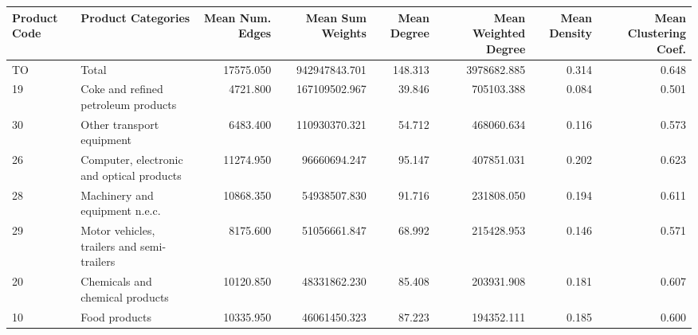 \begin{tabular}{llrrrrrr}
\toprule
Product Code &                                                                                           Product Categories & Mean Num. Edges & Mean Sum Weights & Mean Degree & Mean Weighted Degree & Mean Density & Mean Clustering Coef. \\
\midrule
          TO &                                                                                                        Total &       17575.050 &    942947843.701 &     148.313 &          3978682.885 &        0.314 &                 0.648 \\
          19 &                                                                          Coke and refined petroleum products &        4721.800 &    167109502.967 &      39.846 &           705103.388 &        0.084 &                 0.501 \\
          30 &                                                                                    Other transport equipment &        6483.400 &    110930370.321 &      54.712 &           468060.634 &        0.116 &                 0.573 \\
          26 &                                                                    Computer, electronic and optical products &       11274.950 &     96660694.247 &      95.147 &           407851.031 &        0.202 &                 0.623 \\
          28 &                                                                               Machinery and equipment n.e.c. &       10868.350 &     54938507.830 &      91.716 &           231808.050 &        0.194 &                 0.611 \\
          29 &                                                                   Motor vehicles, trailers and semi-trailers &        8175.600 &     51056661.847 &      68.992 &           215428.953 &        0.146 &                 0.571 \\
          20 &                                                                              Chemicals and chemical products &       10120.850 &     48331862.230 &      85.408 &           203931.908 &        0.181 &                 0.607 \\
          10 &                                                                                                Food products &       10335.950 &     46061450.323 &      87.223 &           194352.111 &        0.185 &                 0.600 \\

\end{tabular}
